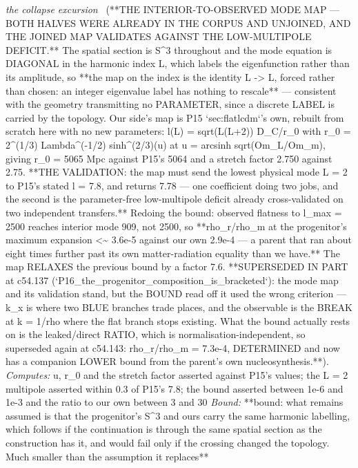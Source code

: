 \begin{description}
\textit{the collapse excursion} \ (**THE INTERIOR-TO-OBSERVED MODE MAP --- BOTH HALVES WERE ALREADY IN THE CORPUS AND UNJOINED, AND THE JOINED MAP VALIDATES AGAINST THE LOW-MULTIPOLE DEFICIT.** The spatial section is S\textasciicircum{}3 throughout and the mode equation is DIAGONAL in the harmonic index L, which labels the eigenfunction rather than its amplitude, so **the map on the index is the identity L -> L, forced rather than chosen: an integer eigenvalue label has nothing to rescale** --- consistent with the geometry transmitting no PARAMETER, since a discrete LABEL is carried by the topology. Our side's map is P15 `sec:flatlcdm`'s own, rebuilt from scratch here with no new parameters: l(L) = sqrt(L(L+2)) D\_C/r\_0 with r\_0 = 2\textasciicircum{}(1/3) Lambda\textasciicircum{}(-1/2) sinh\textasciicircum{}(2/3)(u) at u = arcsinh sqrt(Om\_L/Om\_m), giving r\_0 = 5065 Mpc against P15's 5064 and a stretch factor 2.750 against 2.75. **THE VALIDATION: the map must send the lowest physical mode L = 2 to P15's stated l = 7.8, and returns 7.78 --- one coefficient doing two jobs, and the second is the parameter-free low-multipole deficit already cross-validated on two independent transfers.** Redoing the bound: observed flatness to l\_max = 2500 reaches interior mode 909, not 2500, so **rho\_r/rho\_m at the progenitor's maximum expansion <\textasciitilde{} 3.6e-5 against our own 2.9e-4 --- a parent that ran about eight times further past its own matter-radiation equality than we have.** The map RELAXES the previous bound by a factor 7.6. **SUPERSEDED IN PART at c54.137 (`P16\_the\_progenitor\_composition\_is\_bracketed`): the mode map and its validation stand, but the BOUND read off it used the wrong criterion --- k\_x is where two BLUE branches trade places, and the observable is the BREAK at k = 1/rho where the flat branch stops existing. What the bound actually rests on is the leaked/direct RATIO, which is normalisation-independent, so superseded again at c54.143: rho\_r/rho\_m = 7.3e-4, DETERMINED and now has a companion LOWER bound from the parent's own nucleosynthesis.**). 
\emph{Computes:} u, r\_0 and the stretch factor asserted against P15's values; the L = 2 multipole asserted within 0.3 of P15's 7.8; the bound asserted between 1e-6 and 1e-3 and the ratio to our own between 3 and 30
 \emph{Bound:} **bound: what remains assumed is that the progenitor's S\textasciicircum{}3 and ours carry the same harmonic labelling, which follows if the continuation is through the same spatial section as the construction has it, and would fail only if the crossing changed the topology. Much smaller than the assumption it replaces**

\end{description}

